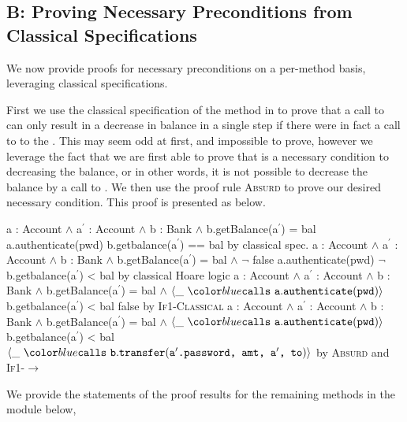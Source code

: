 \subsection{B: Proving Necessary Preconditions from Classical Specifications}
\label{s:BA-classical}
We now provide proofs for necessary preconditions on a per-method basis, leveraging 
classical specifications.

First we use the classical specification of the  method in  to prove that a call to  can only result in 
a decrease in balance in a single step if there were in fact a call to  to the . This may seem 
odd at first, and impossible to prove, however we leverage the fact that we are first able to prove that 
is a necessary condition to decreasing the balance, or in other words, it is not possible to decrease the balance by a
call to . We then use the proof rule \textsc{Absurd} to prove our desired necessary condition.
This proof is presented as  below.
\\
\noindent
{
	\begin{proofexample}
			{\proofstepwithrule
				{\hoareEx
						{a : Account $\wedge$ a$^\prime$ : Account $\wedge$ b : Bank $\wedge$ b.getBalance(a$^\prime$) = bal}
						{a.authenticate(pwd)}
						{b.getbalance(a$^\prime$) == bal}
						}
					{by classical spec.}
			}
			{\proofstepwithrule
				{\hoareEx
						{a : Account $\wedge$ a$^\prime$ : Account $\wedge$ b : Bank $\wedge$ b.getBalance(a$^\prime$) = bal $\wedge$ $\neg$ false}
						{a.authenticate(pwd)}
						{$\neg$ b.getbalance(a$^\prime$) < bal}
						}
					{by classical Hoare logic}
			}
			{\proofstepwithrule
				{\onlyIfSingleEx
						{a : Account $\wedge$ a$^\prime$ : Account $\wedge$ b : Bank $\wedge$ b.getBalance(a$^\prime$) = bal $\wedge$ $\calls{\_}{\prg{a}}{\prg{authenticate}}{\prg{pwd}}$}
						{b.getbalance(a$^\prime$) < bal}
						{false}
						}
					{by \textsc{If1-Classical}}
			}
			{\proofstepwithrule
				{\onlyIfSingleEx
						{a : Account $\wedge$ a$^\prime$ : Account $\wedge$ b : Bank $\wedge$ b.getBalance(a$^\prime$) = bal $\wedge$ $\calls{\_}{\prg{a}}{\prg{authenticate}}{\prg{pwd}}$}
						{b.getbalance(a$^\prime$) < bal}
						{$\calls{\_}{\prg{b}}{\prg{transfer}}{\prg{a$^\prime$.password, amt, a$^\prime$, to}}$}
						}
					{by \textsc{Absurd} and \textsc{If1-}$\longrightarrow$}
			}
		\endproofsteps
	\end{proofexample}
}
We provide the statements of the proof results for the remaining methods in the module below,
